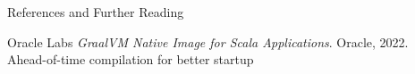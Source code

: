 \documentclass{beamer}
\begin{document}
\begin{frame}[allowframebreaks]{References and Further Reading}
\begin{thebibliography}{15}
\textcolor{pureblue}{Oracle Labs} 
\textit{GraalVM Native Image for Scala Applications}. Oracle, 2022.
\footnotesize{\\ \color{gray}Ahead-of-time compilation for better startup}

\end{thebibliography}

\end{frame}
\end{document}
